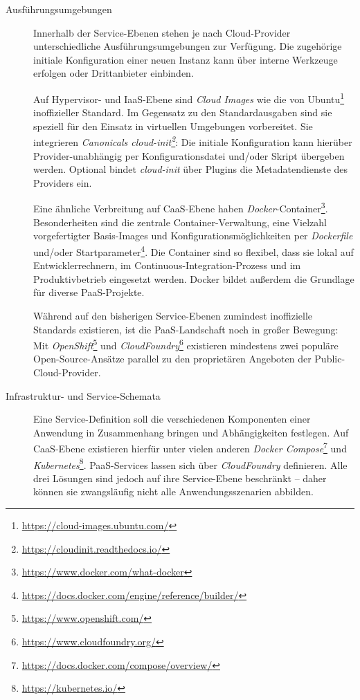 \begin{description}
	
	\item[Ausführungsumgebungen] Innerhalb der Service-Ebenen stehen je nach Cloud-Provider unterschiedliche Ausführungsumgebungen zur Verfügung. Die zugehörige initiale Konfiguration einer neuen Instanz kann über interne Werkzeuge erfolgen oder Drittanbieter einbinden.
	
	Auf Hypervisor- und IaaS-Ebene sind \emph{Cloud Images} wie die von Ubuntu\footnote{\url{https://cloud-images.ubuntu.com/}} inoffizieller Standard. Im Gegensatz zu den Standardausgaben sind sie speziell für den Einsatz in virtuellen Umgebungen vorbereitet. Sie integrieren \emph{Canonicals cloud-init\footnote{\url{https://cloudinit.readthedocs.io/}}}: Die initiale Konfiguration kann hierüber Provider-unabhängig per Konfigurationsdatei und/oder Skript übergeben werden. Optional bindet \emph{cloud-init} über Plugins die Metadatendienste des Providers ein.
	
	Eine ähnliche Verbreitung auf CaaS-Ebene haben \emph{Docker}-Container\footnote{\url{https://www.docker.com/what-docker}}. Besonderheiten sind die zentrale Container-Verwaltung, eine Vielzahl vorgefertigter Basis-Images und Konfigurationsmöglichkeiten per \emph{Dockerfile} und/oder Startparameter\footnote{\url{https://docs.docker.com/engine/reference/builder/}}. Die Container sind so flexibel, dass sie lokal auf Entwicklerrechnern, im Continuous-Integration-Prozess und im Produktivbetrieb eingesetzt werden. Docker bildet außerdem die Grundlage für diverse PaaS-Projekte.
	
	Während auf den bisherigen Service-Ebenen zumindest inoffizielle Standards existieren, ist die PaaS-Landschaft noch in großer Bewegung: Mit \emph{Open\-Shift}\footnote{\url{https://www.openshift.com/}} und \emph{Cloud\-Foundry}\footnote{\url{https://www.cloudfoundry.org/}} existieren mindestens zwei populäre Open-Source-Ansätze parallel zu den proprietären Angeboten der Public-Cloud-Provider.
	
	\item[Infrastruktur- und Service-Schemata] Eine Service-Definition soll die verschiedenen Komponenten einer Anwendung in Zusammenhang bringen und Abhängigkeiten festlegen. Auf CaaS-Ebene existieren hierfür unter vielen anderen \emph{Docker Compose}\footnote{\url{https://docs.docker.com/compose/overview/}} und \emph{Kubernetes}\footnote{\url{https://kubernetes.io/}}. PaaS-Services lassen sich über \emph{CloudFoundry} definieren. Alle drei Lösungen sind jedoch auf ihre Service-Ebene beschränkt -- daher können sie zwangsläufig nicht alle Anwendungsszenarien abbilden.
	

\end{description}
